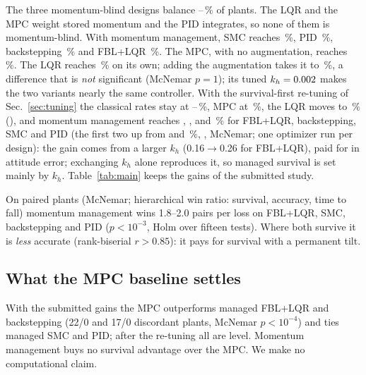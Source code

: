 The three momentum-blind designs balance \backsteppingMcCl--\fblMcCl\,\si{\percent} of
plants. The LQR and the MPC weight stored momentum and the PID integrates, so none of
them is momentum-blind. With
momentum management, SMC reaches \smcMcMm\,\si{\percent}, PID
\pidMcMm\,\si{\percent}, backstepping \backsteppingMcMm\,\si{\percent} and
FBL+LQR \fblMcMm\,\si{\percent}. The MPC, with no
augmentation, reaches \mpcMcCl\,\si{\percent}. The LQR reaches
\lqrMcCl\,\si{\percent} on its own; adding the augmentation takes it to
\lqrMcMm\,\si{\percent}, a difference that is \emph{not} significant
(McNemar $p=1$); its tuned $k_h=0.002$ makes the two variants nearly the same
controller. With the survival-first re-tuning of Sec.~\ref{sec:tuning} the
classical rates stay at \lexClLo--\lexClHi\,\si{\percent}, MPC at
\lexMpc\,\si{\percent}, the LQR moves to \lexLqrCl\,\si{\percent} (\lexLqrP),
and momentum management reaches \lexFblMm, \lexBksMm, \lexSmcMm{} and
\lexPidMm\,\si{\percent} for FBL+LQR, backstepping, SMC and PID (the first two
up from \fblMcMm{} and \backsteppingMcMm\,\si{\percent}, \lexFblP, McNemar; one optimizer run per design):
the gain comes from a larger $k_h$ (\num{0.16}$\to$\num{0.26} for FBL+LQR),
paid for in attitude error; exchanging $k_h$ alone reproduces it, so managed
survival is set mainly by $k_h$.
Table~\ref{tab:main} keeps the gains of the submitted study.

On paired plants (McNemar; hierarchical win ratio: survival, accuracy, time to
fall) momentum management wins \num{1.8}--\num{2.0} pairs per loss on FBL+LQR,
SMC, backstepping and PID ($p<10^{-3}$, Holm over fifteen tests). Where
both survive it is \emph{less} accurate (rank-biserial $r>0.85$): it pays for
survival with a permanent tilt.


\begin{table}[t]
\caption{Nominal and Monte-Carlo metrics, with Wilson \SI{95}{\percent}
intervals; Monte-Carlo rates depend on the offset distribution.
$^\dagger$median over runs that balanced.}
\label{tab:main}
\centering
\scriptsize

\end{table}

\subsection{What the MPC baseline settles}

With the submitted gains the MPC outperforms managed FBL+LQR and backstepping
(22/0 and 17/0 discordant plants, McNemar $p<10^{-4}$) and ties managed SMC and
PID; after the re-tuning all are level. Momentum management buys no survival
advantage over the MPC. We make no computational claim.

